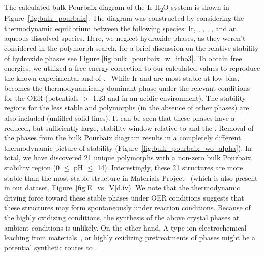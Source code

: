 %
%
The calculated bulk Pourbaix diagram of the Ir-H\textsubscript{2}O system is shown in Figure~\ref{fig:bulk_pourbaix}.
%
The diagram was constructed by considering the thermodynamic equilibrium between the following species: Ir, \rIrOtwo, \aIrOthree, \rIrOthree, \bIrOthree, and an aqueous dissolved \IrOfourm species.
%
Here, we neglect hydroxide phases, as they weren't considered in the polymorph search,
for a brief discussion on the relative stability of hydroxide phases see Figure \ref{fig:bulk_pourbaix_w_irho3}.
%
To obtain free energies, we utilized a free energy correction to our calculated values to reproduce the known experimental \DHf and \DGf of \rIrOtwo.~\cite{Barin1995}
%
While Ir and \rIrOtwo are most stable at low bias, \aIrOthree becomes the thermodynamically dominant phase under the relevant conditions for the OER (potentials $>$ \num{1.23} \VRHE and in an acidic environment).
%
The stability regions for the less stable \bIrOthree and \rIrOthree polymorphs (in the absence of other \IrOthree phases) are also included (unfilled solid lines).
%
It can be seen that these phases have a reduced, but sufficiently large, stability window relative to \IrOtwo and the \IrOfourm.
%
Removal of the \IrOthree phases from the bulk Pourbaix diagram results in a completely different thermodynamic picture of \IrOtwo stability (Figure~\ref{fig:bulk_pourbaix_wo_alpha}).
In total, we have discovered 21 unique \IrOthree polymorphs with a non-zero bulk Pourbaix stability region
(0 $\leq$ pH $\leq$ 14).
%
Interestingly, these 21 structures are more stable than the most stable \IrOthree structure in Materials Project~\cite{mp-1097041} (which is also present in our dataset, Figure~\ref{fig:E_vs_V}d.iv).
%
We note that the thermodynamic driving force toward these stable \IrOthree phases under OER conditions suggests that these structures may form spontaneously under reaction conditions.
%
Because of the highly oxidizing conditions, the synthesis of the above \IrOthree crystal phases at ambient conditions is unlikely.
%
On the other hand,  A-type ion electrochemical leaching from  materials~\cite{Pearce2019, Seitz2016},
or highly oxidizing pretreatments of \IrOtwo phases might be a potential synthetic routes to \IrOthree.


